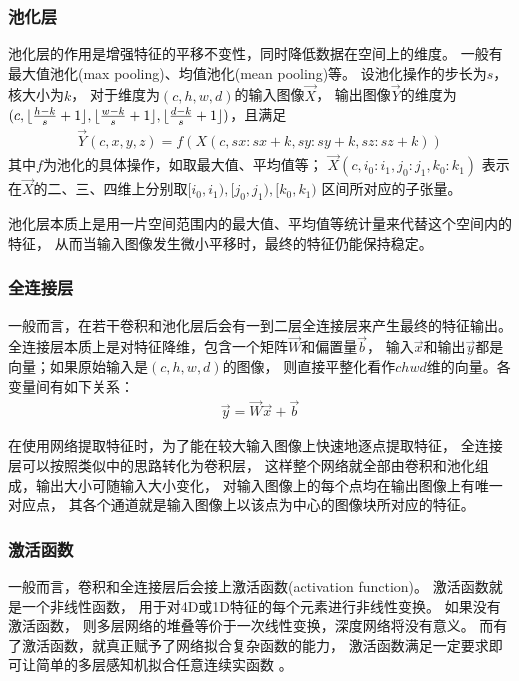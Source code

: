 \subsubsection{池化层}
池化层的作用是增强特征的平移不变性，同时降低数据在空间上的维度。
一般有最大值池化(max pooling)、均值池化(mean pooling)等。
设池化操作的步长为$s$，核大小为$k$，
对于维度为$(c, h, w, d)$的输入图像$\vec{X}$，
输出图像$\vec{Y}$的维度为$(c, \lfloor\frac{h-k}{s}+1\rfloor,
\lfloor\frac{w-k}{s}+1\rfloor, \lfloor\frac{d-k}{s}+1\rfloor)$，且满足
\begin{eqnarray}
    \vec{Y}(c, x, y, z) = f(X(c, sx:sx+k, sy:sy+k, sz:sz+k))
\end{eqnarray}
其中$f$为池化的具体操作，如取最大值、平均值等；
$\vec{X}(c, i_0:i_1, j_0:j_1, k_0:k_1)$
表示在$\vec{X}$的二、三、四维上分别取$[i_0, i_1), [j_0, j_1), [k_0, k_1)$
区间所对应的子张量。

池化层本质上是用一片空间范围内的最大值、平均值等统计量来代替这个空间内的特征，
从而当输入图像发生微小平移时，最终的特征仍能保持稳定。


\subsubsection{全连接层}
一般而言，在若干卷积和池化层后会有一到二层全连接层来产生最终的特征输出。
全连接层本质上是对特征降维，包含一个矩阵$\vec{W}$和偏置量$\vec{b}$，
输入$\vec{x}$和输出$\vec{y}$都是向量；如果原始输入是$(c,h,w,d)$的图像，
则直接平整化看作$chwd$维的向量。各变量间有如下关系：
\begin{eqnarray}
    \vec{y} = \vec{W}\vec{x} + \vec{b}
\end{eqnarray}

在使用网络提取特征时，为了能在较大输入图像上快速地逐点提取特征，
全连接层可以按照类似中的思路转化为卷积层，
这样整个网络就全部由卷积和池化组成，输出大小可随输入大小变化，
对输入图像上的每个点均在输出图像上有唯一对应点，
其各个通道就是输入图像上以该点为中心的图像块所对应的特征。

\subsubsection{激活函数}
一般而言，卷积和全连接层后会接上激活函数(activation function)。
激活函数就是一个非线性函数，
用于对4D或1D特征的每个元素进行非线性变换。
如果没有激活函数，
则多层网络的堆叠等价于一次线性变换，深度网络将没有意义。
而有了激活函数，就真正赋予了网络拟合复杂函数的能力，
激活函数满足一定要求即可让简单的多层感知机拟合任意连续实函数
\cite{hornik1989multilayer}。

